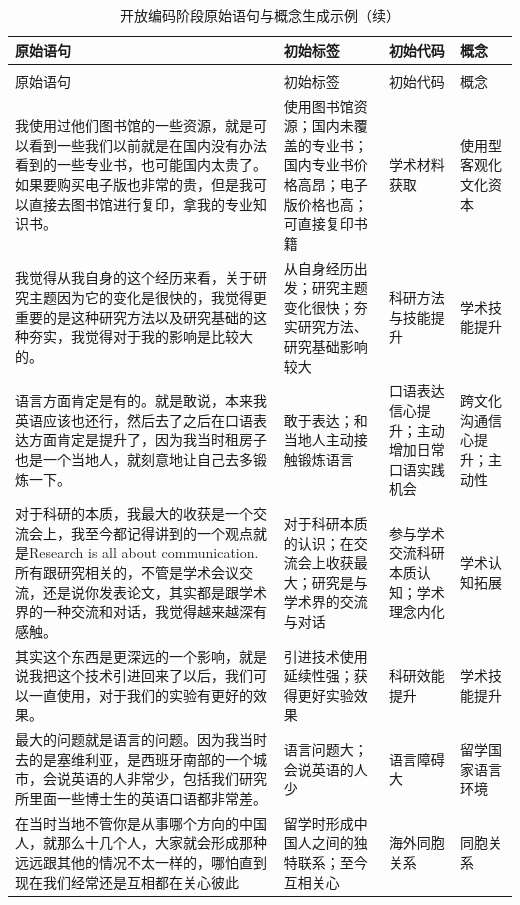 {\small
\begin{longtable}{p{6.5cm}p{2.5cm}p{2.5cm}p{2.5cm}}
\caption{开放编码阶段原始语句与概念生成示例} \label{tab:open-coding} \\
\toprule
原始语句 & 初始标签 & 初始代码 & 概念 \\
\midrule
\endfirsthead
\caption[]{开放编码阶段原始语句与概念生成示例（续）} \\
\toprule
原始语句 & 初始标签 & 初始代码 & 概念 \\
\midrule
\endhead
\bottomrule
\endfoot
我使用过他们图书馆的一些资源，就是可以看到一些我们以前就是在国内没有办法看到的一些专业书，也可能国内太贵了。如果要购买电子版也非常的贵，但是我可以直接去图书馆进行复印，拿我的专业知识书。 & 使用图书馆资源；国内未覆盖的专业书；国内专业书价格高昂；电子版价格也高；可直接复印书籍 & 学术材料获取 & 使用型客观化文化资本 \\
我觉得从我自身的这个经历来看，关于研究主题因为它的变化是很快的，我觉得更重要的是这种研究方法以及研究基础的这种夯实，我觉得对于我的影响是比较大的。 & 从自身经历出发；研究主题变化很快；夯实研究方法、研究基础影响较大 & 科研方法与技能提升 & 学术技能提升 \\
语言方面肯定是有的。就是敢说，本来我英语应该也还行，然后去了之后在口语表达方面肯定是提升了，因为我当时租房子也是一个当地人，就刻意地让自己去多锻炼一下。 & 敢于表达；和当地人主动接触锻炼语言 & 口语表达信心提升；主动增加日常口语实践机会 & 跨文化沟通信心提升；主动性 \\
对于科研的本质，我最大的收获是一个交流会上，我至今都记得讲到的一个观点就是Research is all about communication. 所有跟研究相关的，不管是学术会议交流，还是说你发表论文，其实都是跟学术界的一种交流和对话，我觉得越来越深有感触。 & 对于科研本质的认识；在交流会上收获最大；研究是与学术界的交流与对话 & 参与学术交流科研本质认知；学术理念内化 & 学术认知拓展 \\
其实这个东西是更深远的一个影响，就是说我把这个技术引进回来了以后，我们可以一直使用，对于我们的实验有更好的效果。 & 引进技术使用延续性强；获得更好实验效果 & 科研效能提升 & 学术技能提升 \\
最大的问题就是语言的问题。因为我当时去的是塞维利亚，是西班牙南部的一个城市，会说英语的人非常少，包括我们研究所里面一些博士生的英语口语都非常差。 & 语言问题大；会说英语的人少 & 语言障碍大 & 留学国家语言环境 \\
在当时当地不管你是从事哪个方向的中国人，就那么十几个人，大家就会形成那种远远跟其他的情况不太一样的，哪怕直到现在我们经常还是互相都在关心彼此 & 留学时形成中国人之间的独特联系；至今互相关心 & 海外同胞关系 & 同胞关系 \\

\end{longtable}}
